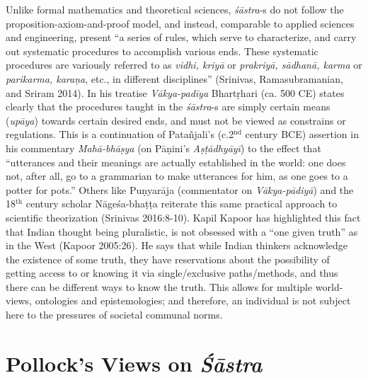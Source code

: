 Unlike formal mathematics and theoretical sciences, {\sl śāstra}-s do not follow the proposition-axiom-and-proof model, and instead, comparable to applied sciences and engineering, present ``a series of rules, which serve to characterize, and carry out systematic procedures to accomplish various ends. These systematic procedures are variously referred to as {\sl vidhi, kriyā} or {\sl prakriyā, sādhanā, karma} or {\sl parikarma, karaṇa}, etc., in different disciplines'' (Srinivas, Ramasubramanian, and Sriram 2014). In his treatise {\sl Vākya-padīya} Bhartṛhari (ca. 500 CE) states clearly that the procedures taught in the {\sl śāstra}-s are simply certain means ({\sl upāya}) towards certain desired ends, and must not be viewed as constrains or regulations. This is a continuation of Patañjali's (c.2$^{\text{nd}}$ century BCE) assertion in his commentary {\sl Mahā-bhāṣya} (on Pāṇini’s {\sl Aṣṭādhyāyī}) to the effect that ``utterances and their meanings are actually established in the world: one does not, after all, go to a grammarian to make utterances for him, as one goes to a potter for pots.'' Others like Puṇyarāja (commentator on {\sl Vākya-pādiyā}) and the 18$^{\text{th}}$ century scholar Nāgeśa-bhaṭṭa reiterate this same practical approach to scientific theorization (Srinivas 2016:8-10). Kapil Kapoor has highlighted this fact that Indian thought being pluralistic, is not obsessed with a ``one given truth'' as in the West (Kapoor 2005:26). He says that while Indian thinkers acknowledge the existence of some truth, they have reservations about the possibility of getting access to or knowing it via single/exclusive paths/methods, and thus there can be different ways to know the truth. This allows for multiple world-views, ontologies and epistemologies; and therefore, an individual is not subject here to the pressures of societal communal norms.  

\section*{Pollock’s Views on {\sl\bfseries Śāstra}}

